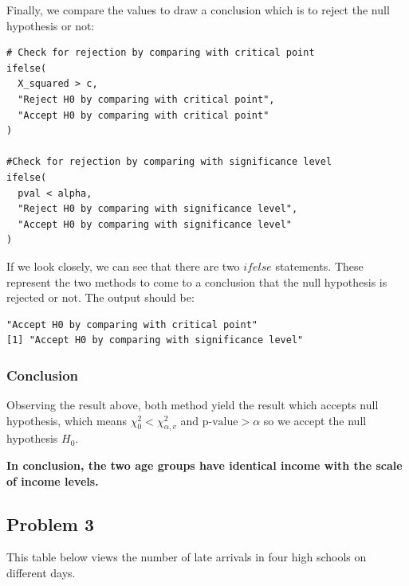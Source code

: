 \documentclass[a4paper]{article}
\numberwithin{equation}{section}
\begin{document}
Finally, we compare the values to draw a conclusion which is to reject the null hypothesis or not:
\begin{mdframed}[leftline=false,rightline=false,backgroundcolor=magenta!10,nobreak=true]
  \begin{verbatim}
# Check for rejection by comparing with critical point
ifelse(
  X_squared > c,
  "Reject H0 by comparing with critical point",
  "Accept H0 by comparing with critical point"
)

#Check for rejection by comparing with significance level
ifelse(
  pval < alpha,
  "Reject H0 by comparing with significance level",
  "Accept H0 by comparing with significance level"
)
  \end{verbatim}
\end{mdframed}

If we look closely, we can see that there are two \(ifelse\) statements. These represent the two methods to come to a conclusion that the null hypothesis is rejected or not. The output should be:
\begin{mdframed}[leftline=false,rightline=false,backgroundcolor=magenta!10,nobreak=true]
  \begin{verbatim}
"Accept H0 by comparing with critical point"
[1] "Accept H0 by comparing with significance level"
  \end{verbatim}
\end{mdframed}

\subsubsection{Conclusion}
Observing the result above, both method yield the result which accepts null hypothesis, which means \(\chi_0^2 < \chi_{\alpha, v}^2\) and \(\text{p-value} > \alpha \) so we accept the null hypothesis \(H_0\).

\textbf{In conclusion, the two age groups have identical income with the scale of income levels.}

\newpage
\subsection{Problem 3}

This table below views the number of late arrivals in four high schools on different days.
\end{document}
